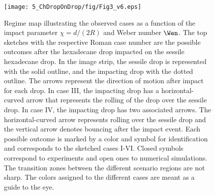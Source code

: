 \begin{figure}
	\centering
	\texttt{[image: 5\_ChDropOnDrop/fig/Fig3\_v6.eps]}
	\caption{Regime map illustrating the observed cases as a function of the impact parameter $\chi=d/\left(2R\right)$ and Weber number $\Wen$. The top sketches with the respective Roman case number are the possible outcomes after the hexadecane drop impacted on the sessile hexadecane drop. In the image strip, the sessile drop is represented with the solid outline, and the impacting drop with the dotted outline. The arrows represent the direction of motion after impact for each drop. In case III, the impacting drop has a horizontal-curved arrow that represents the rolling of the drop over the sessile drop. In case IV, the impacting drop has two associated arrows. The horizontal-curved arrow represents rolling over the sessile drop and the vertical arrow denotes bouncing after the impact event. Each possible outcome is marked by a color and symbol for identification and corresponds to the sketched cases I-VI. Closed symbols correspond to experiments and open ones to numerical simulations. The transition zones between the different scenario regions are not sharp. The colors assigned to the different cases are meant as a guide to the eye. }
	\label{ChDoD:fig3}
\end{figure}

